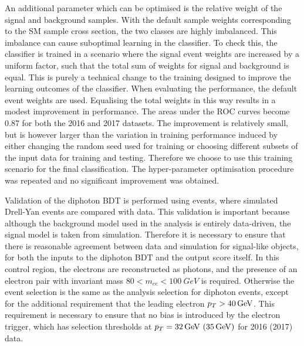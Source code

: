 An additional parameter which can be optimised is the relative weight 
of the signal and background samples.
With the default sample weights corresponding to the SM sample cross section, 
the two classes are highly imbalanced.
This imbalance can cause suboptimal learning in the classifier.
To check this, the classifier is trained in a scenario 
where the signal event weights are increased by a uniform factor, 
such that the total sum of weights for signal and background is equal.
This is purely a technical change to the training 
designed to improve the learning outcomes of the classifier.
When evaluating the performance, the default event weights are used.
Equalising the total weights in this way results in a modest improvement in performance.
The areas under the ROC curves become 0.87 for both the 2016 and 2017 datasets.
The improvement is relatively small, 
but is however larger than the variation 
in training performance induced by either changing the random seed used for training or 
choosing different subsets of the input data for training and testing.
Therefore we choose to use this training scenario for the final classification.
The hyper-parameter optimisation procedure was repeated 
and no significant improvement was obtained.


Validation of the diphoton BDT is performed using \Zee events, 
where simulated Drell-Yan events are compared with data.
This validation is important because although the background model used in the analysis 
is entirely data-driven, the signal model is taken from simulation.
Therefore it is necessary to ensure that there is reasonable agreement 
between data and simulation for signal-like objects,
for both the inputs to the diphoton BDT and the output score itself.
In this \Zee control region, the electrons are reconstructed as photons, 
and the presence of an electron pair with invariant mass $80 < m_{ee} < \SI{100}{GeV}$ is required.
Otherwise the event selection is the same as the analysis selection for diphoton events, 
except for the additional requirement that the leading electron $p_T > \SI{40}{GeV}$.
This requirement is necessary to ensure that no bias is introduced by the electron trigger, 
which has selection thresholds at $p_T = \SI{32}{GeV}~(\SI{35}{GeV})$ for 2016 (2017) data.

